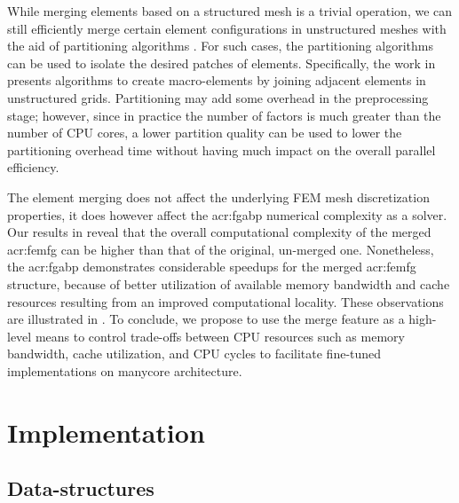 While merging elements based on a structured mesh is a trivial operation, we can still efficiently merge certain element configurations in unstructured meshes with the aid of partitioning algorithms \cite{bib:parmetis2013,bib:parmetisMan,bib:metis,bib:parmetisKarypis1996}.
For such cases, the partitioning algorithms can be used to isolate the desired patches of elements.
Specifically, the work in \cite{bib:ChanAgg} presents algorithms to create macro-elements by joining adjacent elements in unstructured grids.
Partitioning may add some overhead in the preprocessing stage; however, since in practice the number of factors is much greater than the number of CPU cores, a lower partition quality can be used to lower the partitioning overhead time \cite{bib:parmetisMan} without having much impact on the overall parallel efficiency.

The element merging does not affect the underlying FEM mesh discretization properties, it does however affect the \gls{acr:fgabp} numerical complexity as a solver.
Our results in  reveal that the overall computational complexity of the merged \gls{acr:femfg} can be higher than that of the original, un-merged one.
Nonetheless, the \gls{acr:fgabp} demonstrates considerable speedups for the merged \gls{acr:femfg} structure, because of better utilization of available memory bandwidth and cache resources resulting from an improved computational locality.
These observations are illustrated in .
To conclude, we propose to use the merge feature as a high-level means to control trade-offs between CPU resources such as memory bandwidth, cache utilization, and CPU cycles to facilitate fine-tuned implementations on manycore architecture.


\section{Implementation}
\label{sec:fgabpImp}

\subsection{Data-structures}
\label{sec:fgabpDS}

